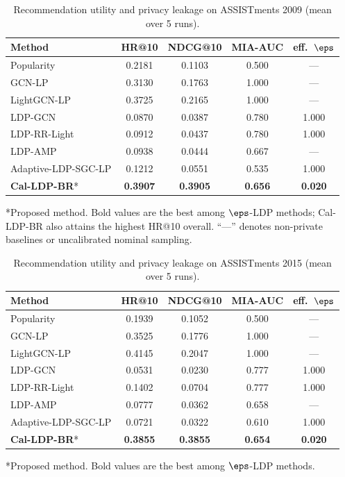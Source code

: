 \begin{table}[t]
\caption{Recommendation utility and privacy leakage on ASSISTments 2009 (mean over 5 runs).}
\label{tab:main09}
\small
\begin{tabular}{@{}lcccc@{}}
\toprule
Method & HR@10 & NDCG@10 & MIA-AUC & eff.\ $\eps$ \\
\midrule
Popularity & 0.2181 & 0.1103 & 0.500 & --- \\
GCN-LP & 0.3130 & 0.1763 & 1.000 & --- \\
LightGCN-LP & 0.3725 & 0.2165 & 1.000 & --- \\
LDP-GCN & 0.0870 & 0.0387 & 0.780 & 1.000 \\
LDP-RR-Light & 0.0912 & 0.0437 & 0.780 & 1.000 \\
LDP-AMP & 0.0938 & 0.0444 & 0.667 & --- \\
Adaptive-LDP-SGC-LP & 0.1212 & 0.0551 & 0.535 & 1.000 \\
\textbf{Cal-LDP-BR}* & \textbf{0.3907} & \textbf{0.3905} & \textbf{0.656} & \textbf{0.020} \\
\bottomrule
\end{tabular}
\vspace{2pt}\noindent\footnotesize
\footnotesize
*Proposed method. Bold values are the best among $\eps$-LDP methods; Cal-LDP-BR also attains the highest HR@10 overall. ``---'' denotes non-private baselines or uncalibrated nominal sampling.

\end{table}

\begin{table}[t]
\caption{Recommendation utility and privacy leakage on ASSISTments 2015 (mean over 5 runs).}
\label{tab:main15}
\small
\begin{tabular}{@{}lcccc@{}}
\toprule
Method & HR@10 & NDCG@10 & MIA-AUC & eff.\ $\eps$ \\
\midrule
Popularity & 0.1939 & 0.1052 & 0.500 & --- \\
GCN-LP & 0.3525 & 0.1776 & 1.000 & --- \\
LightGCN-LP & 0.4145 & 0.2047 & 1.000 & --- \\
LDP-GCN & 0.0531 & 0.0230 & 0.777 & 1.000 \\
LDP-RR-Light & 0.1402 & 0.0704 & 0.777 & 1.000 \\
LDP-AMP & 0.0777 & 0.0362 & 0.658 & --- \\
Adaptive-LDP-SGC-LP & 0.0721 & 0.0322 & 0.610 & 1.000 \\
\textbf{Cal-LDP-BR}* & \textbf{0.3855} & \textbf{0.3855} & \textbf{0.654} & \textbf{0.020} \\
\bottomrule
\end{tabular}
\vspace{2pt}\noindent\footnotesize
\footnotesize
*Proposed method. Bold values are the best among $\eps$-LDP methods.

\end{table}

